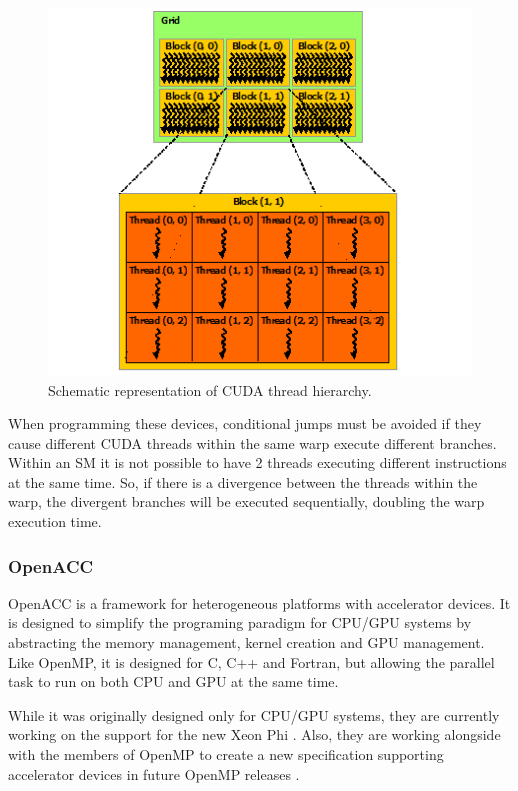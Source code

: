 \begin{figure}[!htp]
	\begin{center}
		\includegraphics[scale=0.8]{../../common/img/cuda_hierarchy.png}
		\caption{Schematic representation of CUDA thread hierarchy.}
		\label{fig:CUDAHierarchy}
	\end{center}
\end{figure}

When programming these devices, conditional jumps must be avoided if they cause different CUDA threads within the same warp execute different branches. Within an SM it is not possible to have 2 threads executing different instructions at the same time. So, if there is a divergence between the threads within the warp, the divergent branches will be executed sequentially, doubling the warp execution time.

\subsubsection*{OpenACC}
\label{OpenACC}

OpenACC \cite{OpenACC} is a framework for heterogeneous platforms with accelerator devices. It is designed to simplify the programing paradigm for CPU/GPU systems by abstracting the memory management, kernel creation and GPU management. Like OpenMP, it is designed for C, C++ and Fortran, but allowing the parallel task to run on both CPU and GPU at the same time.

While it was originally designed only for CPU/GPU systems, they are currently working on the support for the new \intel Xeon Phi \cite{OpenACC:HPCWire}. Also, they are working alongside with the members of OpenMP to create a new specification supporting accelerator devices in future OpenMP releases \cite{OpenACC:OpenMP}.

